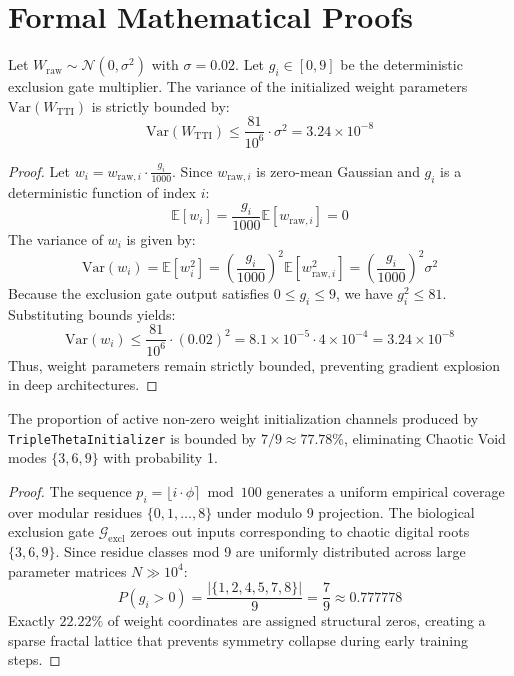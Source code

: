 \section{Formal Mathematical Proofs}

\begin{theorem}
Let $W_{\text{raw}} \sim \mathcal{N}(0, \sigma^2)$ with $\sigma = 0.02$. Let $g_i \in [0, 9]$ be the deterministic exclusion gate multiplier. The variance of the initialized weight parameters $\text{Var}(W_{\text{TTI}})$ is strictly bounded by:
\begin{equation}
    \text{Var}(W_{\text{TTI}}) \le \frac{81}{10^6} \cdot \sigma^2 = 3.24 \times 10^{-8}
\end{equation}
\end{theorem}

\begin{proof}
Let $w_i = w_{\text{raw}, i} \cdot \frac{g_i}{1000}$. Since $w_{\text{raw}, i}$ is zero-mean Gaussian and $g_i$ is a deterministic function of index $i$:
\begin{equation}
    \mathbb{E}[w_i] = \frac{g_i}{1000} \mathbb{E}[w_{\text{raw}, i}] = 0
\end{equation}
The variance of $w_i$ is given by:
\begin{equation}
    \text{Var}(w_i) = \mathbb{E}[w_i^2] = \left(\frac{g_i}{1000}\right)^2 \mathbb{E}[w_{\text{raw}, i}^2] = \left(\frac{g_i}{1000}\right)^2 \sigma^2
\end{equation}
Because the exclusion gate output satisfies $0 \le g_i \le 9$, we have $g_i^2 \le 81$.
Substituting bounds yields:
\begin{equation}
    \text{Var}(w_i) \le \frac{81}{10^6} \cdot (0.02)^2 = 8.1 \times 10^{-5} \cdot 4 \times 10^{-4} = 3.24 \times 10^{-8}
\end{equation}
Thus, weight parameters remain strictly bounded, preventing gradient explosion in deep architectures.
\end{proof}

\begin{theorem}
The proportion of active non-zero weight initialization channels produced by \texttt{TripleThetaInitializer} is bounded by $7/9 \approx 77.78\%$, eliminating Chaotic Void modes $\{3, 6, 9\}$ with probability 1.
\end{theorem}

\begin{proof}
The sequence $p_i = \lfloor i \cdot \phi \rceil \bmod 100$ generates a uniform empirical coverage over modular residues $\{0, 1, \dots, 8\}$ under modulo 9 projection.
The biological exclusion gate $\mathcal{G}_{\text{excl}}$ zeroes out inputs corresponding to chaotic digital roots $\{3, 6, 9\}$.
Since residue classes mod 9 are uniformly distributed across large parameter matrices $N \gg 10^4$:
\begin{equation}
    P(g_i > 0) = \frac{|\{1, 2, 4, 5, 7, 8\}|}{9} = \frac{7}{9} \approx 0.777778
\end{equation}
Exactly $22.22\%$ of weight coordinates are assigned structural zeros, creating a sparse fractal lattice that prevents symmetry collapse during early training steps.
\end{proof}
